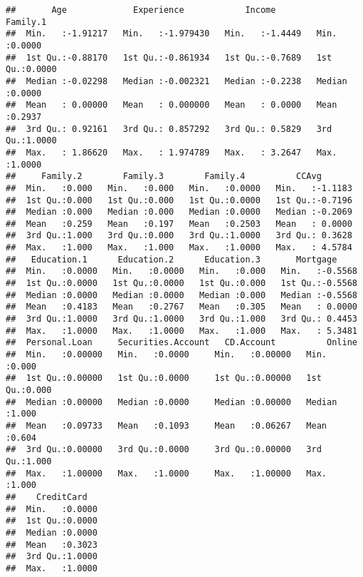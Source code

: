 \documentclass[
]{article}
\begin{document}
\begin{verbatim}
##       Age             Experience            Income           Family.1     
##  Min.   :-1.91217   Min.   :-1.979430   Min.   :-1.4449   Min.   :0.0000  
##  1st Qu.:-0.88170   1st Qu.:-0.861934   1st Qu.:-0.7689   1st Qu.:0.0000  
##  Median :-0.02298   Median :-0.002321   Median :-0.2238   Median :0.0000  
##  Mean   : 0.00000   Mean   : 0.000000   Mean   : 0.0000   Mean   :0.2937  
##  3rd Qu.: 0.92161   3rd Qu.: 0.857292   3rd Qu.: 0.5829   3rd Qu.:1.0000  
##  Max.   : 1.86620   Max.   : 1.974789   Max.   : 3.2647   Max.   :1.0000  
##     Family.2        Family.3        Family.4          CCAvg        
##  Min.   :0.000   Min.   :0.000   Min.   :0.0000   Min.   :-1.1183  
##  1st Qu.:0.000   1st Qu.:0.000   1st Qu.:0.0000   1st Qu.:-0.7196  
##  Median :0.000   Median :0.000   Median :0.0000   Median :-0.2069  
##  Mean   :0.259   Mean   :0.197   Mean   :0.2503   Mean   : 0.0000  
##  3rd Qu.:1.000   3rd Qu.:0.000   3rd Qu.:1.0000   3rd Qu.: 0.3628  
##  Max.   :1.000   Max.   :1.000   Max.   :1.0000   Max.   : 4.5784  
##   Education.1      Education.2      Education.3       Mortgage      
##  Min.   :0.0000   Min.   :0.0000   Min.   :0.000   Min.   :-0.5568  
##  1st Qu.:0.0000   1st Qu.:0.0000   1st Qu.:0.000   1st Qu.:-0.5568  
##  Median :0.0000   Median :0.0000   Median :0.000   Median :-0.5568  
##  Mean   :0.4183   Mean   :0.2767   Mean   :0.305   Mean   : 0.0000  
##  3rd Qu.:1.0000   3rd Qu.:1.0000   3rd Qu.:1.000   3rd Qu.: 0.4453  
##  Max.   :1.0000   Max.   :1.0000   Max.   :1.000   Max.   : 5.3481  
##  Personal.Loan     Securities.Account   CD.Account          Online     
##  Min.   :0.00000   Min.   :0.0000     Min.   :0.00000   Min.   :0.000  
##  1st Qu.:0.00000   1st Qu.:0.0000     1st Qu.:0.00000   1st Qu.:0.000  
##  Median :0.00000   Median :0.0000     Median :0.00000   Median :1.000  
##  Mean   :0.09733   Mean   :0.1093     Mean   :0.06267   Mean   :0.604  
##  3rd Qu.:0.00000   3rd Qu.:0.0000     3rd Qu.:0.00000   3rd Qu.:1.000  
##  Max.   :1.00000   Max.   :1.0000     Max.   :1.00000   Max.   :1.000  
##    CreditCard    
##  Min.   :0.0000  
##  1st Qu.:0.0000  
##  Median :0.0000  
##  Mean   :0.3023  
##  3rd Qu.:1.0000  
##  Max.   :1.0000
\end{verbatim}
\end{document}
